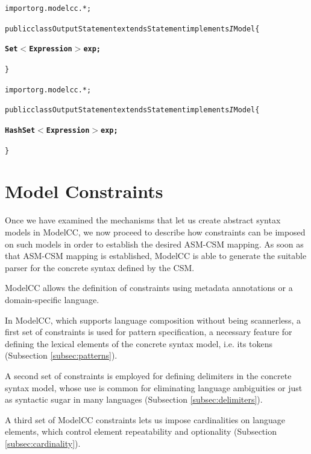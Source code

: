 \documentclass[a4paper,twoside,onecolumn]{article}
\newenvironment{colframe}{%
  \begin{Sbox} 
    \begin{minipage}{.8\columnwidth} 
}{%

  \end{minipage} 
  \end{Sbox} 
  \begin{center} 
    \fcolorbox{black}{MyGray}{\TheSbox} 
  \end{center} 
}
\begin{document}
\begin{colframe}
\begin{alltt}
import org.modelcc.*;

public class OutputStatement extends Statement implements{\emph IModel} \{

  {\bf\unskip Set\(<\)Expression\(>\) exp;}

\}
\end{alltt}
\end{colframe}

\begin{colframe}
\begin{alltt}
import org.modelcc.*;

public class OutputStatement extends Statement implements{\emph IModel} \{

  {\bf\unskip HashSet\(<\)Expression\(>\) exp;}

\}
\end{alltt}
\end{colframe}


\section{Model Constraints} \label{sec:modelcons}

Once we have examined the mechanisms that let us create abstract syntax models in ModelCC, we now proceed to describe how constraints can be imposed on such models in order to establish the desired ASM-CSM mapping.
As soon as that ASM-CSM mapping is established, ModelCC is able to generate the suitable parser for the concrete syntax defined by the CSM.

ModelCC allows the definition of constraints using metadata annotations or a domain-specific language.

In ModelCC, which supports language composition without being scannerless, a first set of constraints is used for pattern specification, a necessary feature for defining the lexical elements of the concrete syntax model, i.e. its tokens (Subsection \ref{subsec:patterns}).

A second set of constraints is employed for defining delimiters in the concrete syntax model, whose use is common for eliminating language ambiguities or just as syntactic sugar in many languages (Subsection \ref{subsec:delimiters}).

A third set of ModelCC constraints lets us impose cardinalities on language elements, which control element repeatability and optionality (Subsection \ref{subsec:cardinality}).
\end{document}
